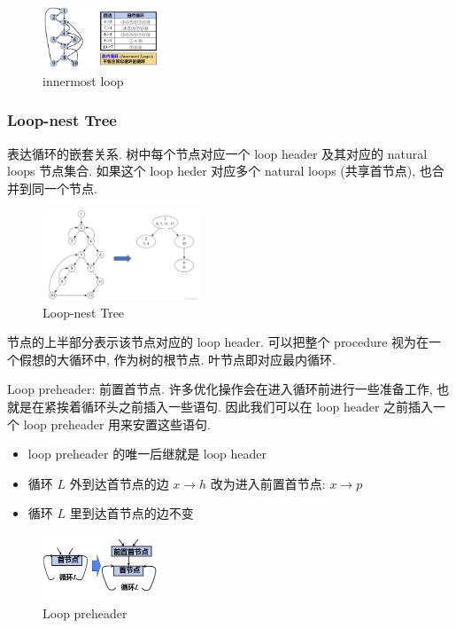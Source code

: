 \begin{figure}[!htb]
    \centering
    \includegraphics[width=0.309\textwidth]{pic/CP18/innermost loop}
    \caption{innermost loop}
\end{figure}


\subsubsection{Loop-nest Tree}
表达循环的嵌套关系. 树中每个节点对应一个 loop header 及其对应的 natural loops 节点集合. 如果这个 loop heder 对应多个 natural loops (共享首节点), 也合并到同一个节点. 

\begin{figure}[!htb]
    \centering
    \includegraphics[width=0.42\textwidth]{pic/CP18/Loop-nest Tree}
    \caption{Loop-nest Tree}
\end{figure}
节点的上半部分表示该节点对应的 loop header. 可以把整个 procedure 视为在一个假想的大循环中, 作为树的根节点. 叶节点即对应最内循环. 

Loop preheader: 前置首节点. 许多优化操作会在进入循环前进行一些准备工作, 也就是在紧挨着循环头之前插入一些语句. 因此我们可以在 loop header 之前插入一个 loop preheader 用来安置这些语句. 
\begin{itemize}
    \item loop preheader 的唯一后继就是 loop header
    \item 循环 $L$ 外到达首节点的边 $x\to h$ 改为进入前置首节点: $x\to p$
    \item 循环 $L$ 里到达首节点的边不变
\end{itemize}

\begin{figure}[!htb]
    \centering
    \includegraphics[width=0.309\textwidth]{pic/CP18/Loop preheader}
    \caption{Loop preheader}
\end{figure}


